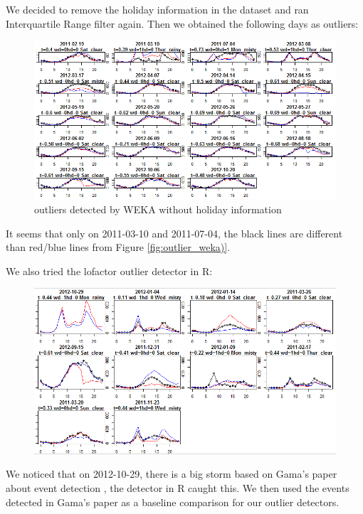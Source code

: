 \documentclass[12pt]{article}
\begin{document}
	We decided to remove the holiday information in the dataset and ran Interquartile Range filter again. Then we obtained the following days as outliers:
		\begin{figure}[H]
			\includegraphics[scale=.65]{figures/outlier_weka_nonholliday.png}
			\caption{outliers detected by WEKA without holiday information}
			\label{fig:outlier_weka}
		\end{figure}
	It seems that only on 2011-03-10 and 2011-07-04, the black lines are different than red/blue lines from Figure \ref{fig:outlier_weka)}.
	
	We also tried the lofactor outlier detector in R:
	\begin{figure}[H]
		\includegraphics[scale=0.7]{figures/outlier_R.png}
	\end{figure}
 We noticed that on 2012-10-29, there is a big storm based on Gama's paper about event detection \cite{dataset}, the detector in R caught this. We then used the events detected in Gama's paper as a baseline comparison for our outlier detectors. 
\end{document}
